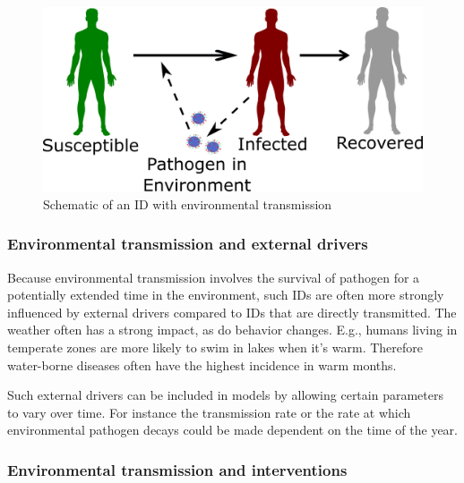 \documentclass[]{article}
\theoremstyle{definition}
\theoremstyle{definition}
\theoremstyle{definition}
\theoremstyle{remark}
\begin{document}
\begin{figure}
\centering
\includegraphics{./images/environmentaltransmissionscheme.png}
\caption{Schematic of an ID with environmental transmission}
\end{figure}

\subsubsection{Environmental transmission and external
drivers}\label{environmental-transmission-and-external-drivers}

Because environmental transmission involves the survival of pathogen for
a potentially extended time in the environment, such IDs are often more
strongly influenced by external drivers compared to IDs that are
directly transmitted. The weather often has a strong impact, as do
behavior changes. E.g., humans living in temperate zones are more likely
to swim in lakes when it's warm. Therefore water-borne diseases often
have the highest incidence in warm months.

Such external drivers can be included in models by allowing certain
parameters to vary over time. For instance the transmission rate or the
rate at which environmental pathogen decays could be made dependent on
the time of the year.

\subsubsection{Environmental transmission and
interventions}\label{environmental-transmission-and-interventions}
\end{document}
